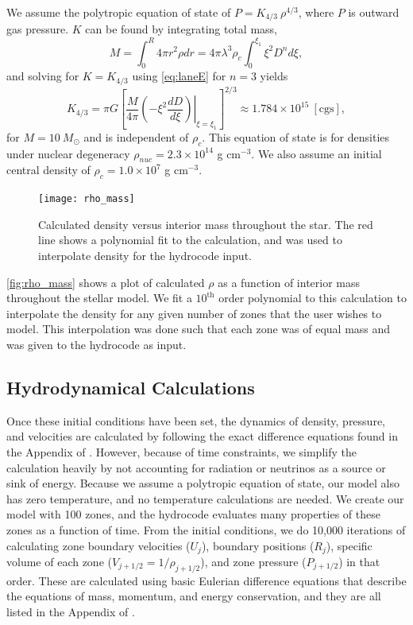 \documentclass[12pt]{article}
\begin{document}
We assume the polytropic equation of state of
$P = K_{4/3}\ \rho^{4/3}$, where $P$ is outward gas pressure. $K$ can be found
by integrating total mass,
\begin{equation}
    M = \int_0^R 4\pi r^2 \rho dr = 4\pi \lambda^3 \rho_c \int_0^{\xi_1} \xi^2 D^n d\xi,
\end{equation}
and solving for $K = K_{4/3}$ using \autoref{eq:laneE} for $n=3$ yields
\begin{equation}
    K_{4/3} = \pi G \left[ \frac{M}{4\pi} \left.\left(-\xi^2 \frac{dD}{d\xi}\right)\right|_{\xi=\xi_1} \right]^{2/3} \approx 1.784 \times 10^{15}\ [\text{cgs}],
\end{equation}
for $M = 10\ M_\odot$ and is independent of $\rho_c$. This equation of state is for densities under nuclear degeneracy
$\rho_{nuc} = 2.3 \times 10^{14}$ g cm$^{-3}$. We also assume an initial
central density of $\rho_c = 1.0 \times 10^7$ g cm$^{-3}$.

\begin{figure}[ht]
    \centering
    \texttt{[image: rho\_mass]}
    \caption{Calculated density versus interior mass throughout the star. The red line
             shows a polynomial fit to the calculation, and was used to interpolate
             density for the hydrocode input.}
    \label{fig:rho_mass}
\end{figure}

\autoref{fig:rho_mass} shows a plot of calculated $\rho$ as a function of interior
mass throughout the stellar model. We fit a $10^\text{th}$ order polynomial to this
calculation to interpolate the density for any given number of zones that the user wishes to
model. This interpolation was done such that each zone was of equal mass and was given
to the hydrocode as input.


\subsection{Hydrodynamical Calculations}

Once these initial conditions have been set, the dynamics of density, pressure,
and velocities are calculated by following the exact difference equations found
in the Appendix of \citet{arnett66}. However, because of time constraints, we
simplify the calculation heavily by not accounting for radiation or neutrinos
as a source or sink of energy. Because we assume a polytropic equation of state, our
model also has zero temperature, and no temperature calculations are needed.
We create our model with 100 zones, and the hydrocode evaluates many properties
of these zones as a function of time.
From the initial conditions, we do 10,000 iterations of calculating zone
boundary velocities ($U_j$), boundary positions ($R_j$), specific volume of
each zone ($V_{j + 1/2} = 1 / \rho_{j + 1/2}$), and zone pressure
($P_{j + 1/2}$) in that order. These are calculated using basic Eulerian difference
equations that describe the equations of mass, momentum, and energy
conservation, and they are all listed in the Appendix of \citet{arnett66}.
\end{document}
